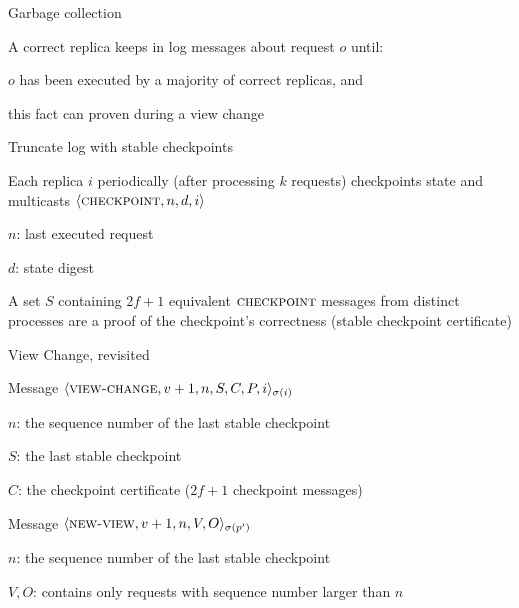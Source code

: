 \begin{frame}{Garbage collection}

\BIL
\item A correct replica keeps in log messages about request $o$ until:
	\BI
	\item $o$ has been executed by a majority of correct replicas, and
	\item this fact can proven during a view change
	\EI
\item Truncate log with stable checkpoints
	\BI
	\item Each replica $i$ periodically (after processing $k$ requests) 
	checkpoints state and multicasts $\langle \textsc{checkpoint}, n, d, i \rangle$
		\BI
		\item $n$:		last executed request
		\item $d$:		state digest
		\EI
	\EI
\item A set $S$ containing $2f +1$ equivalent $\textsc{checkpoint}$ messages from distinct
processes are a proof of the checkpoint's correctness (\alert{stable checkpoint certificate})
\EIL
\end{frame}

\begin{frame}{View Change, revisited}

\BIL
\item Message $\langle \textsc{view-change} ,v+1,n,S,C,P,i \rangle_{\sigma(i)}$
	\BI
	\item $n$:		the sequence number of the last stable checkpoint 
	\item $S$:		the last stable checkpoint
	\item $C$:		the checkpoint certificate ($2f+1$ checkpoint messages)
	\EI
\item Message $\langle \textsc{new-view}, v+1, n, V, O \rangle_{\sigma(p')}$
	\BI
	\item $n$:		the sequence number of the last stable checkpoint 
	\item $V,O$: 	contains only requests with sequence number larger than $n$
	\EI
\EIL

\end{frame}

